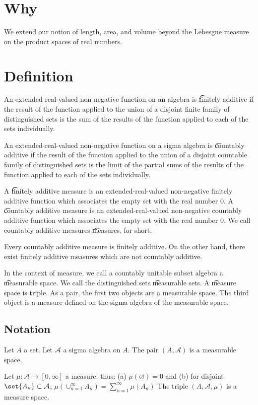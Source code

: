 
\section*{Why}

We extend our notion of length, area, and volume beyond the Lebesgue measure on the product spaces of real numbers.

\section*{Definition}

An extended-real-valued non-negative function on an algebra is \t{finitely additive} if the result of the function applied to the union of a disjoint finite family of distinguished sets is the sum of the results of the function applied to each of the sets individually.

An extended-real-valued non-negative function on a sigma algebra is \t{countably additive} if the result of the function applied to the union of a disjoint countable family of distinguished sets is the limit of the partial sums of the results of the function applied to each of the sets individually.

A \t{finitely additive measure} is an extended-real-valued non-negative finitely additive function which associates the empty set with the real number $0$.
A \t{countably additive measure} is an extended-real-valued non-negative countably additive function which associates the empty set with the real number $0$.
We call countably additive measures \t{measures}, for short.

Every countably additive measure is finitely additive.
On the other hand, there exist finitely additive measures which are not countably additive.

In the context of measure, we call a countably unitable subset algebra a \t{measurable space}.
We call the distinguished sets \t{measurable} sets.
A \t{measure space} is triple.
As a pair, the first two objects are a measurable space.
The third object is a measure defined on the sigma algebra of the measurable space.

\subsection*{Notation}

Let $A$ a set.
Let $\mathcal{A} $ a sigma algebra on $A$.
The pair $(A, \mathcal{A} )$ is a measurable space.

Let $\mu : \mathcal{A}  \to [0, \infty]$ a measure;
thus:
(a) $\mu (\varnothing) = 0$ and
(b) for disjoint $\set{A_n} \subset \mathcal{A} $,
$\mu (\cup_{n = 1}^{\infty} A_n) = \sum_{n = 1}^{\infty} \mu (A_n)$
The triple $(A, \mathcal{A} , \mu )$ is a measure space.

